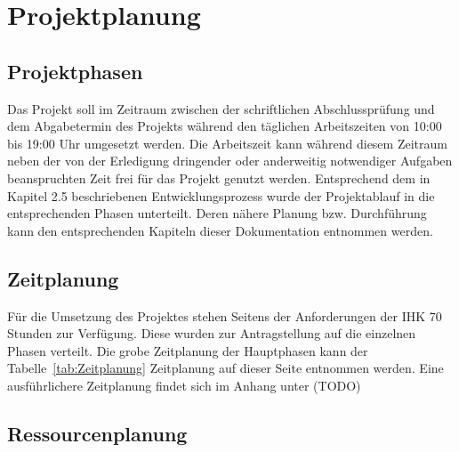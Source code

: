 \section{Projektplanung} 
\label{sec:Projektplanung}

\subsection{Projektphasen}
\label{sec:Projektphasen}
Das Projekt soll im Zeitraum zwischen der schriftlichen Abschlussprüfung und dem Abgabetermin des Projekts während den täglichen Arbeitszeiten von 10:00 bis 19:00 Uhr umgesetzt werden. Die Arbeitszeit kann während diesem Zeitraum neben der von der Erledigung dringender oder anderweitig notwendiger Aufgaben beanspruchten Zeit frei für das Projekt genutzt werden. Entsprechend dem in Kapitel 2.5 beschriebenen Entwicklungsprozess wurde der Projektablauf in die entsprechenden Phasen unterteilt. Deren nähere Planung bzw. Durchführung kann den entsprechenden Kapiteln dieser Dokumentation entnommen werden.

\subsection{Zeitplanung}
\label{sec:Zeitplanung}
Für die Umsetzung des Projektes stehen Seitens der Anforderungen der IHK 70 Stunden zur Verfügung. Diese wurden zur Antragstellung auf die einzelnen Phasen verteilt. Die grobe Zeitplanung der Hauptphasen kann der Tabelle~\ref{tab:Zeitplanung} Zeitplanung auf dieser Seite entnommen werden. Eine ausführlichere Zeitplanung findet sich im Anhang unter (TODO)



\subsection{Ressourcenplanung}
\label{sec:Ressourcenplanung}

